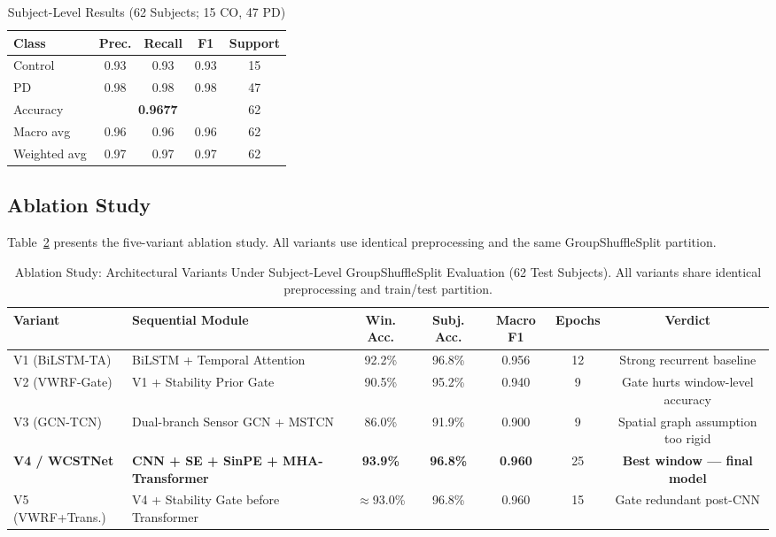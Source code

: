 \documentclass[lettersize,journal]{IEEEtran}
\begin{document}
\begin{table}[!t]
\caption{Subject-Level Results (62 Subjects; 15 CO, 47 PD)}
\label{tab:subject}
\centering
\renewcommand{\arraystretch}{1.2}
\begin{tabular}{lcccc}
\toprule
\textbf{Class} & \textbf{Prec.} & \textbf{Recall} & \textbf{F1}
& \textbf{Support} \\
\midrule
Control & 0.93 & 0.93 & 0.93 & 15 \\
PD      & 0.98 & 0.98 & 0.98 & 47 \\
\midrule
Accuracy    & \multicolumn{3}{c}{\textbf{0.9677}} & 62 \\
Macro avg   & 0.96 & 0.96 & 0.96 & 62 \\
Weighted avg& 0.97 & 0.97 & 0.97 & 62 \\
\bottomrule
\end{tabular}
\end{table}

\subsection{Ablation Study}
\label{sec:ablation}

Table~\ref{tab:ablation} presents the five-variant ablation study.
All variants use identical preprocessing and the same
GroupShuffleSplit partition.

\begin{table}[t]
\caption{Ablation Study: Architectural Variants Under Subject-Level
GroupShuffleSplit Evaluation (62 Test Subjects).
All variants share identical preprocessing and train/test partition.}
\label{tab:ablation}
\centering
\renewcommand{\arraystretch}{1.2}
\begin{tabular}{llccccc}
\toprule
\textbf{Variant} & \textbf{Sequential Module} &
\textbf{Win. Acc.} & \textbf{Subj. Acc.} & \textbf{Macro F1}
& \textbf{Epochs} & \textbf{Verdict} \\
\midrule
V1 (BiLSTM-TA)
  & BiLSTM + Temporal Attention
  & 92.2\% & 96.8\% & 0.956 & 12
  & Strong recurrent baseline \\
V2 (VWRF-Gate)
  & V1 + Stability Prior Gate
  & 90.5\% & 95.2\% & 0.940 & 9
  & Gate hurts window-level accuracy \\
V3 (GCN-TCN)
  & Dual-branch Sensor GCN + MSTCN
  & 86.0\% & 91.9\% & 0.900 & 9
  & Spatial graph assumption too rigid \\
\textbf{V4 / WCSTNet}
  & \textbf{CNN + SE + SinPE + MHA-Transformer}
  & \textbf{93.9\%} & \textbf{96.8\%} & \textbf{0.960} & 25
  & \textbf{Best window — final model} \\
V5 (VWRF+Trans.)
  & V4 + Stability Gate before Transformer
  & $\approx$93.0\% & 96.8\% & 0.960 & 15
  & Gate redundant post-CNN \\
\bottomrule
\end{tabular}
\end{table}
\end{document}
